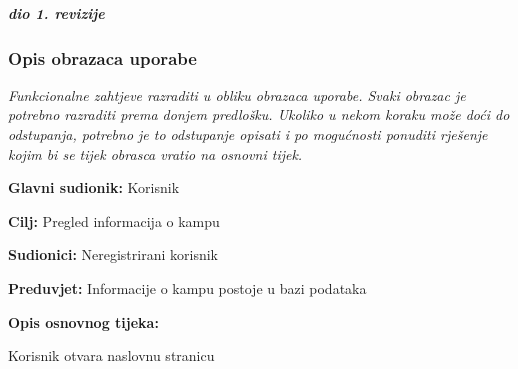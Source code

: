 				\textbf{\textit{dio 1. revizije}}
				
				\subsubsection{Opis obrazaca uporabe}
					\textit{Funkcionalne zahtjeve razraditi u obliku obrazaca uporabe. Svaki obrazac je potrebno razraditi prema donjem predlošku. Ukoliko u nekom koraku može doći do odstupanja, potrebno je to odstupanje opisati i po mogućnosti ponuditi rješenje kojim bi se tijek obrasca vratio na osnovni tijek.}\\
					
					
					\noindent {}
					\begin{packed_item}
						
						\item \textbf{Glavni sudionik: } Korisnik
						\item  \textbf{Cilj:} Pregled informacija o kampu
						\item  \textbf{Sudionici:} Neregistrirani korisnik
						\item  \textbf{Preduvjet:} Informacije o kampu postoje u bazi podataka
						\item  \textbf{Opis osnovnog tijeka:}
						
						\item[] \begin{packed_enum}
							
							\item Korisnik otvara naslovnu stranicu
							
						\end{packed_enum}
						
						
					\end{packed_item}
					
